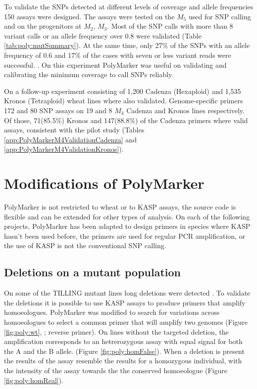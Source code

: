 To validate the SNPs detected at different levels of coverage and allele frequencies 150 assays were designed.
The assays were tested on the $M_{5}$ used for SNP calling and on the progenitors at $M_{2}$, $M_{3}$. 
Most of the SNP calls with more than 8 variant calls or an allele frequency over 0.8 were validated (Table \ref{tab:poly:mutSummary}). 
At the same time, only 27\% of the SNPs with an allele frequency of 0.6 and 17\% of the cases with seven or less variant reads were successful. \citep{King2015}. 
On this experiment PolyMarker was useful on validating and calibrating the minimum coverage to call SNPs reliably. 



On a follow-up experiment consisting of 1,200 Cadenza (Hexaploid) and 1,535 Kronos (Tetraploid) wheat lines \citep{Krasileva2016} where also validated. Genome-specific primers  172 and 80 SNP assays on 19 and 8 $M_{4}$ Cadenza and Kronos lines respectively. 
Of those, 71(85.5\%) Kronos and 147(88.8\%) of the Cadenza primers where valid assays, consistent with the pilot study (Tables \ref{app:PolyMarkerM4ValidationCadenza} and \ref{app:PolyMarkerM4ValidationKronos}).  

\section{Modifications of PolyMarker}
PolyMarker is not restricted to wheat or to KASP assays, the source code is flexible and can be extended for other types of analysis. 
On each of the following projects, PolyMarker has been adapted to design primers in species where KASP hasn't been used before, the primers are used for regular PCR amplification, or the use of KASP is not the conventional SNP calling. 

\subsection{Deletions on a mutant population}
  

On some of the TILLING mutant lines long deletions were detected \citep{Krasileva2016}.
To validate the deletions it is possible to use KASP assays to produce primers that amplify homoeologues.  
PolyMarker was modified to search for variations across homoeologues to select a common primer that will amplify two genomes (Figure \ref{fig:poly:wt}, ; reverse primer). 
On lines without the targeted deletion, the amplification corresponds to an hetrerozygous assay with equal signal for both the A and the B allele. (Figure \ref{fig:poly:homFalse}).  
When a deletion is present the results of the assay resemble the results for a homozygous individual, with the intensity of the assay towards the the conserved homoeologue (Figure \ref{fig:poly:homReal}).

